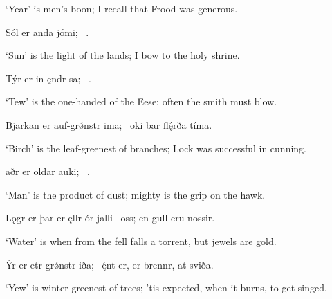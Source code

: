 \bvb ‘Year’ is men’s boon; I recall that Frood was generous.\evb\evg


\bvg\bva%
Sól er anda jómi; \hld\ .\eva

\bvb ‘Sun’ is the light of the lands; I bow to the holy shrine.\evb\evg


\bvg\bva%
Týr er in-ęndr sa; \hld\ .\eva

\bvb ‘Tew’ is the one-handed of the Eese; often the smith must blow.\evb\evg


\bvg\bva%
Bjarkan er auf-grǿnstr ima; \hld\ oki bar flę́rða tíma.\eva

\bvb ‘Birch’ is the leaf-greenest of branches; Lock was successful in cunning.\evb\evg


\bvg\bva%
aðr er oldar auki; \hld\ .\eva

\bvb ‘Man’ is the product of dust; mighty is the grip on the hawk.\evb\evg


\bvg\bva%
Lǫgr er þar er ęllr ór jalli \hld\ oss; en gull eru nossir.\eva

\bvb ‘Water’ is when from the fell falls a torrent, but jewels are gold.\evb\evg


\bvg\bva%
Ýr er etr-grǿnstr iða; \hld\ ę́nt er, er brennr, at sviða. \eva

\bvb ‘Yew’ is winter-greenest of trees; ’tis expected, when it burns, to get singed.\evb\evg

\sectionline
